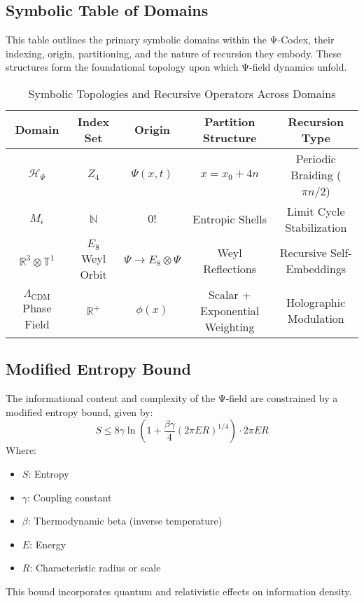 \documentclass[11pt]{article}
\newcommand{\Zfour}{Z_4} %
\newcommand{\LCDM}{\Lambda_{\text{CDM}}} %
\begin{document}
\subsection*{Symbolic Table of Domains}
This table outlines the primary symbolic domains within the Ψ-Codex, their indexing, origin, partitioning, and the nature of recursion they embody. These structures form the foundational topology upon which Ψ-field dynamics unfold.

\begin{table}[htbp]
\centering
\begin{adjustbox}{width=\textwidth}
\begin{tabular}{@{}ccccc@{}}
\toprule
\textbf{Domain} & \textbf{Index Set} & \textbf{Origin} & \textbf{Partition Structure} & \textbf{Recursion Type} \\
\midrule
\(\mathcal{H}_\Psi\) & \(\Zfour\) & \(\Psi(x,t)\) & \(x = x_0 + 4n\) & Periodic Braiding (\(\pi n/2\)) \\
\(M_\epsilon\) & \(\mathbb{N}\) & \(0!\) & Entropic Shells & Limit Cycle Stabilization \\
\(\mathbb{R}^3 \otimes \mathbb{T}^1\) & \(E_8\) Weyl Orbit & \(\Psi \to E_8 \otimes \Psi\) & Weyl Reflections & Recursive Self-Embeddings \\
\(\LCDM\) Phase Field & \(\mathbb{R}^+\) & \(\phi(x)\) & Scalar + Exponential Weighting & Holographic Modulation \\
\bottomrule
\end{tabular}
\end{adjustbox}
\caption{Symbolic Topologies and Recursive Operators Across Domains}
\label{tab:symbolic_domains}
\end{table}

\subsection{Modified Entropy Bound}
The informational content and complexity of the Ψ-field are constrained by a modified entropy bound, given by:
\[
S \leq 8\gamma \ln\left(1 + \frac{\beta\gamma}{4}(2\pi ER)^{1/4}\right) \cdot 2\pi ER
\]
Where:
\begin{itemize}
    \item \( S \): Entropy
    \item \( \gamma \): Coupling constant
    \item \( \beta \): Thermodynamic beta (inverse temperature)
    \item \( E \): Energy
    \item \( R \): Characteristic radius or scale
\end{itemize}
This bound incorporates quantum and relativistic effects on information density.
\end{document}
